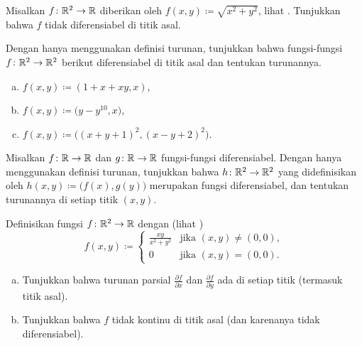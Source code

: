 \begin{exercise}
Misalkan $f \colon {\mathbb{R}}^2 \to {\mathbb{R}}$ diberikan oleh
$f(x,y)
\coloneqq
\sqrt{x^2+y^2}$,
lihat .
Tunjukkan bahwa $f$ tidak diferensiabel di titik asal.
\end{exercise}

\begin{myfigureht}
\caption{Grafik $\sqrt{x^2+y^2}$.\label{fig:distfromorgfunc}}
\end{myfigureht}

\begin{samepage}
\begin{exercise}
Dengan hanya menggunakan definisi turunan, tunjukkan bahwa
fungsi-fungsi $f \colon {\mathbb{R}}^2 \to {\mathbb{R}}^2$ berikut diferensiabel di titik asal dan
tentukan turunannya.
\begin{enumerate}[a)]
\item
$f(x,y) \coloneqq (1+x+xy,x)$,
\item
$f(x,y) \coloneqq \bigl(y-y^{10},x \bigr)$,
\item
$f(x,y) \coloneqq \bigl( {(x+y+1)}^2 , {(x-y+2)}^2 \bigr)$.
\end{enumerate}
\end{exercise}
\end{samepage}

\begin{exercise}
Misalkan $f \colon {\mathbb{R}} \to {\mathbb{R}}$ dan $g \colon {\mathbb{R}} \to {\mathbb{R}}$ fungsi-fungsi diferensiabel.
Dengan hanya menggunakan definisi turunan, tunjukkan bahwa
$h \colon {\mathbb{R}}^2 \to {\mathbb{R}}^2$ yang didefinisikan oleh $h(x,y)
\coloneqq \bigl(f(x),g(y)\bigr)$ merupakan fungsi diferensiabel, dan tentukan
turunannya di setiap titik $(x,y)$.
\end{exercise}

\begin{exercise} \label{exercise:noncontpartialsexist}
Definisikan fungsi $f \colon {\mathbb{R}}^2 \to {\mathbb{R}}$ dengan
(lihat )
\begin{equation*}
f(x,y)
\coloneqq
\begin{cases}
\frac{xy}{x^2+y^2} & \text{jika } (x,y) \neq (0,0), \\
0                  & \text{jika } (x,y) = (0,0).
\end{cases}
\end{equation*}
\begin{enumerate}[a)]
\item
Tunjukkan bahwa turunan parsial
$\frac{\partial f}{\partial x}$ dan
$\frac{\partial f}{\partial y}$ ada di setiap titik (termasuk titik asal).
\item
Tunjukkan bahwa $f$ tidak kontinu di titik asal (dan karenanya tidak
diferensiabel).
\end{enumerate}
\end{exercise}

